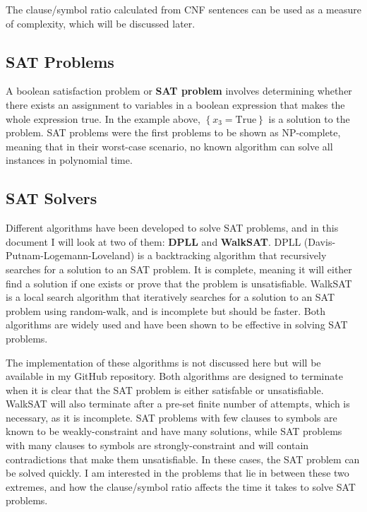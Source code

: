 \documentclass{article}
\begin{document}
    The clause/symbol ratio calculated from CNF sentences can be used as a measure of complexity, which will be discussed later.

    \subsection{SAT Problems}

    A boolean satisfaction problem or \textbf{SAT problem} involves determining whether there exists an assignment to variables in a boolean expression that makes the whole expression true.\supercite{sat-np-complete-cook} In the example above, $\left\{x_3 = \text{True}\right\}$ is a solution to the problem. SAT problems were the first problems to be shown as NP-complete, meaning that in their worst-case scenario, no known algorithm can solve all instances in polynomial time.\supercite{britannica-np-complete}

    \subsection{SAT Solvers}
    Different algorithms have been developed to solve SAT problems, and in this document I will look at two of them: \textbf{DPLL} and \textbf{WalkSAT}. DPLL (Davis-Putnam-Logemann-Loveland) is a backtracking algorithm that recursively searches for a solution to an SAT problem. It is complete, meaning it will either find a solution if one exists or prove that the problem is unsatisfiable. WalkSAT is a local search algorithm that iteratively searches for a solution to an SAT problem using random-walk, and is incomplete but should be faster. Both algorithms are widely used and have been shown to be effective in solving SAT problems.\supercite{dpll-algorithm}\supercite{selman1994noise}

    The implementation of these algorithms is not discussed here but will be available in my GitHub repository. Both algorithms are designed to terminate when it is clear that the SAT problem is either satisfable or unsatisfiable. WalkSAT will also terminate after a pre-set finite number of attempts, which is necessary, as it is incomplete. SAT problems with few clauses to symbols are known to be weakly-constraint and have many solutions, while SAT problems with many clauses to symbols are strongly-constraint and will contain contradictions that make them unsatisfiable.\supercite{Norvig_2021} In these cases, the SAT problem can be solved quickly. I am interested in the problems that lie in between these two extremes, and how the clause/symbol ratio affects the time it takes to solve SAT problems.
\end{document}
